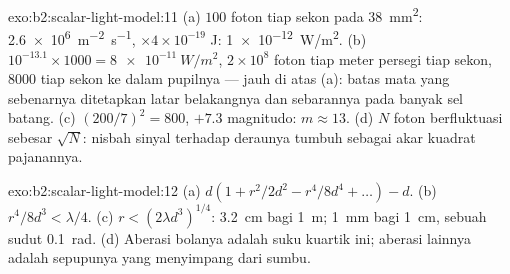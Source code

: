 \begin{solution}{exo:b2:scalar-light-model:11}
(a) $100$ foton tiap sekon pada \qty{38}{mm^2}: \qty{2.6e6}{m^{-2}.s^{-1}}, $\times4 \times
10^{-19}$ J: \qty{1e-12}{W/m^2}. (b) $10^{-13.1} \times 1000 = \qty{8e-11}{W/m^2}$, $2 \times 10^8$
foton tiap meter persegi tiap sekon, $8000$ tiap sekon ke dalam pupilnya
--- jauh di atas (a): batas mata yang sebenarnya ditetapkan latar belakangnya dan
sebarannya pada banyak sel batang. (c) $(200/7)^2 = 800$, $+7.3$ magnitudo: $m \approx
13$. (d) $N$ foton berfluktuasi sebesar $\sqrt N$: nisbah sinyal terhadap deraunya tumbuh sebagai
akar kuadrat pajanannya.
\end{solution}

\begin{solution}{exo:b2:scalar-light-model:12}
(a) $d(1 + r^2/2d^2 - r^4/8d^4 + \dots) - d$. (b) $r^4/8d^3 < \lambda/4$. (c) $r <
(2\lambda d^3)^{1/4}$: \qty{3.2}{cm} bagi \qty{1}{m}; \qty{1}{mm} bagi \qty{1}{cm}, sebuah sudut
\qty{0.1}{rad}. (d) Aberasi bolanya adalah suku kuartik ini; aberasi
lainnya adalah sepupunya yang menyimpang dari sumbu.
\end{solution}

